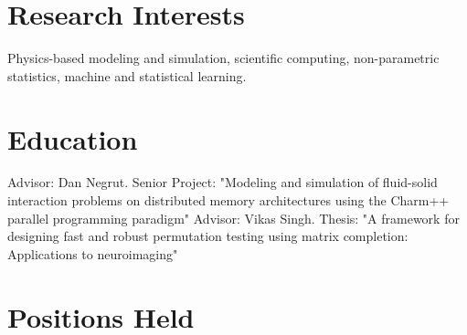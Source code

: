 \documentclass[11pt,a4paper,sans]{moderncv}        %
\begin{document}
\makecvtitle

\section{Research Interests}
Physics-based modeling and simulation, scientific computing, non-parametric
statistics, machine and statistical learning.

\section{Education}
{Advisor: Dan Negrut. Senior Project: "Modeling and simulation of fluid-solid interaction problems on distributed memory architectures using the Charm++ parallel programming paradigm"}  %
{Advisor: Vikas Singh. Thesis: "A framework for designing fast and robust permutation testing using matrix completion: Applications to neuroimaging"}


\section{Positions Held}
\end{document}
